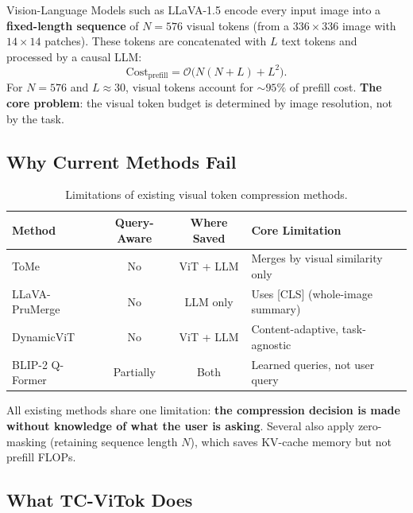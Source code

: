 \documentclass[11pt,a4paper]{article}
\begin{document}
\begin{definitionbox}[title={The Fixed-Budget Problem}]
Vision-Language Models such as LLaVA-1.5 encode every input image into a
\textbf{fixed-length sequence} of $N = 576$ visual tokens (from a
$336 \times 336$ image with $14 \times 14$ patches). These tokens are
concatenated with $L$ text tokens and processed by a causal LLM:
\begin{equation}
  \text{Cost}_{\text{prefill}} = \mathcal{O}\bigl(N(N + L) + L^2\bigr).
\end{equation}
For $N = 576$ and $L \approx 30$, visual tokens account for $\sim\!95\%$
of prefill cost. \textbf{The core problem}: the visual token budget is
determined by image resolution, not by the task.
\end{definitionbox}

\subsection{Why Current Methods Fail}

\begin{table}[h]
\centering
\caption{Limitations of existing visual token compression methods.}
\label{tab:existing_methods}
\renewcommand{\arraystretch}{1.2}
\small
\begin{tabular}{@{}lccll@{}}
  \toprule
  Method & Query-Aware & Where Saved & Core Limitation \\
  \midrule
  ToMe & No & ViT + LLM & Merges by visual similarity only \\
  LLaVA-PruMerge & No & LLM only & Uses {[CLS]} (whole-image summary) \\
  DynamicViT & No & ViT + LLM & Content-adaptive, task-agnostic \\
  BLIP-2 Q-Former & Partially & Both & Learned queries, not user query \\
  \bottomrule
\end{tabular}
\end{table}

\noindent All existing methods share one limitation: \textbf{the compression
decision is made without knowledge of what the user is asking}.
Several also apply zero-masking (retaining sequence length $N$), which
saves KV-cache memory but not prefill FLOPs.

\subsection{What TC-ViTok Does}
\end{document}
